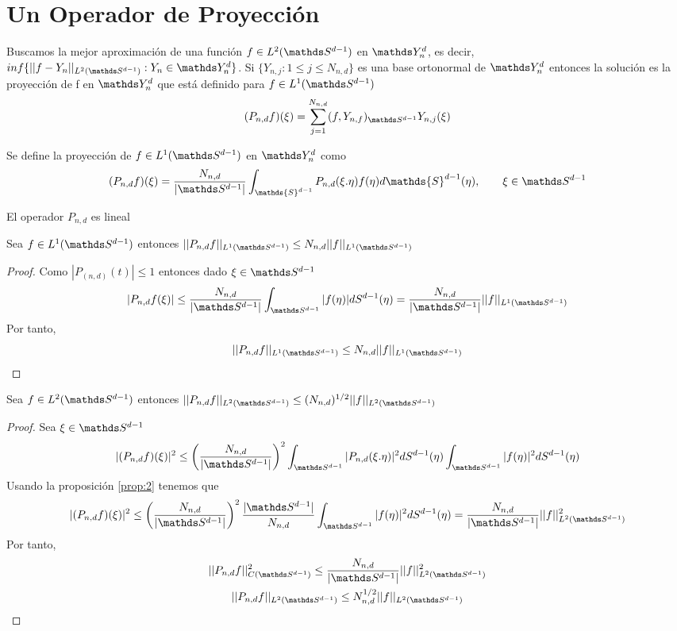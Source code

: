 \section{Un Operador de Proyección}
Buscamos la mejor aproximación de una función $f\in L^2(\sphere)$ en $\spharm$, es decir, $inf\{||f-Y_n||_{L^2(\sphere)}: Y_n \in \spharm\}$. Si $\{Y_{n,j} : 1\le j \le N_{n,d}\}$ es una base ortonormal de $\spharm$ entonces la solución es la proyección de f en $\spharm$ que está definido para $f\in L^1(\sphere)$ 
$$ (P_{n,d}f)(\xi) = \sum_{j=1}^{N_{n,d}}(f,Y_{n,f})_{\sphere} Y_{n,j}(\xi)$$


\begin{defn}Se define la proyección de $f\in L^1(\sphere)$ en $\spharm$ como $$
		(P_{n,d}f)(\xi) =\frac{N_{n,d}}{|\sphere|} \int_{\mathds{S}^{d-1}}P_{n,d}(\xi.\eta)f(\eta)d\mathds{S}^{d-1}(\eta),\qquad \xi\in\sphere
	$$
\end{defn}
\begin{rem}El operador $P_{n,d}$ es lineal
\end{rem}
\begin{prop}Sea $f\in L^1(\sphere)$ entonces $||P_{n,d}f||_{L^1(\sphere)} \le N_{n,d}||f||_{L^1(\sphere)}$
\end{prop}
\begin{proof}
Como $|P_(n,d)(t)|\le 1$ entonces dado $\xi \in \sphere$
\begin{gather*}
|P_{n,d}f(\xi)|\le \frac{N_{n,d}}{|\sphere|} \sphint |f(\eta)| dS^{d-1}(\eta) = \frac{N_{n,d}}{|\sphere|} ||f||_{L^1(\sphere)}
\end{gather*}
Por tanto, $$ ||P_{n,d}f||_{L^1(\sphere)} \le N_{n,d}||f||_{L^1(\sphere)}$$
\end{proof}
\begin{prop}Sea $f \in L^2(\sphere)$ entonces $||P_{n,d}f||_{L^2(\sphere)} \le (N_{n,d})^{1/2}||f||_{L^2(\sphere)}$
\end{prop}
\begin{proof}
Sea $\xi \in \sphere$
\begin{gather*}
|(P_{n,d}f)(\xi)|^2 \le \left(\frac{N_{n,d}}{|\sphere|}\right)^2 \sphint |P_{n,d}(\xi.\eta)|^2 dS^{d-1}(\eta) \sphint |f(\eta)|^2 dS^{d-1}(\eta)
\end{gather*}
Usando la proposición  \hyperref[]{\ref*{prop:2}} tenemos que 
\begin{gather*}
 |(P_{n,d}f)(\xi)|^2 \le \left(\frac{N_{n,d}}{|\sphere|}\right)^2  \frac{|\sphere|}{N_{n,d}}  \sphint |f(\eta)|^2 dS^{d-1}(\eta)=\frac{N_{n,d}}{|\sphere|}||f||^2_{L^2(\sphere)}
\end{gather*}
Por tanto, \begin{gather*}
||P_{n,d}f||^2_{C(\sphere)} \le \frac{N_{n,d}}{|\sphere|}||f||^2_{L^2(\sphere)} \\
||P_{n,d}f||_{L^2(\sphere)} \le N_{n,d}^{1/2}||f||_{L^2(\sphere)}
\end{gather*} 
\end{proof}

